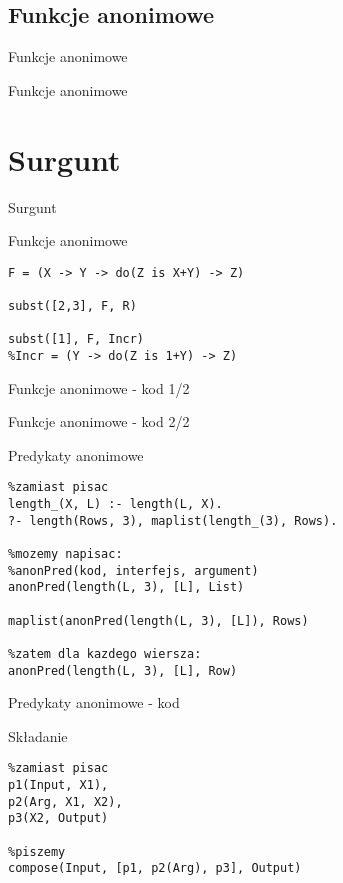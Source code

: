 \documentclass[blue]{beamer}
\newcommand{\tytul}[1]{\begin{frame}\begin{center}\begin{Huge}#1\end{Huge}\end{center}\end{frame}}
\begin{document}
\subsection{Funkcje anonimowe}
\tytul{Funkcje anonimowe}
\begin{frame}{Funkcje anonimowe}

\end{frame}
\section{Surgunt}
\tytul{Surgunt}
\begin{frame}[fragile]{Funkcje anonimowe}
\begin{lstlisting}
F = (X -> Y -> do(Z is X+Y) -> Z)

subst([2,3], F, R)

subst([1], F, Incr)
%Incr = (Y -> do(Z is 1+Y) -> Z)
\end{lstlisting}
\end{frame}
\begin{frame}{Funkcje anonimowe - kod 1/2}

\end{frame}
\begin{frame}{Funkcje anonimowe - kod 2/2}

\end{frame}
\begin{frame}[fragile]{Predykaty anonimowe}
\begin{lstlisting}
%zamiast pisac
length_(X, L) :- length(L, X).
?- length(Rows, 3), maplist(length_(3), Rows).

%mozemy napisac:
%anonPred(kod, interfejs, argument)
anonPred(length(L, 3), [L], List)

maplist(anonPred(length(L, 3), [L]), Rows)

%zatem dla kazdego wiersza:
anonPred(length(L, 3), [L], Row)
\end{lstlisting}
\end{frame}
\begin{frame}{Predykaty anonimowe - kod}

\end{frame}
\begin{frame}[fragile]{Składanie}
\begin{lstlisting}
%zamiast pisac
p1(Input, X1),
p2(Arg, X1, X2),
p3(X2, Output)

%piszemy
compose(Input, [p1, p2(Arg), p3], Output)
\end{lstlisting}
\end{frame}
\end{document}
